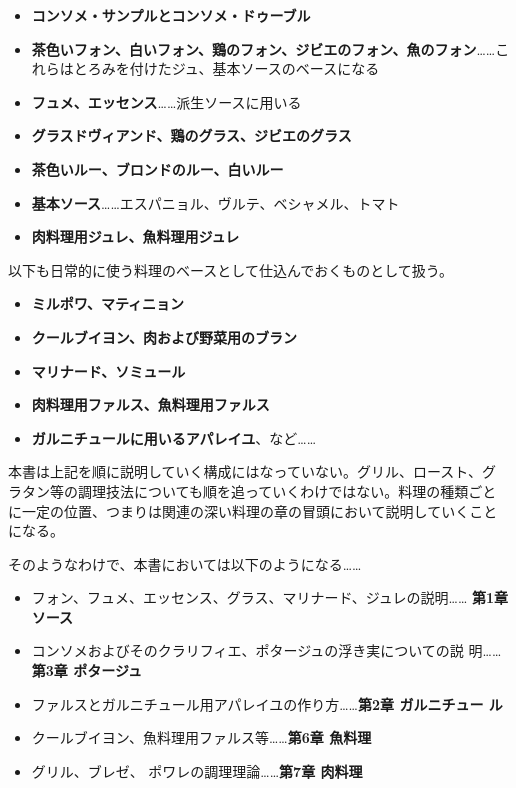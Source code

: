 \begin{itemize}
\tightlist
\item
  \textbf{コンソメ・サンプルとコンソメ・ドゥーブル}
\item
  \textbf{茶色いフォン、白いフォン、鶏のフォン、ジビエのフォン、魚のフォン}\ldots{}\ldots{}これらはとろみを付けたジュ、基本ソースのベースになる
\item
  \textbf{フュメ、エッセンス}\ldots{}\ldots{}派生ソースに用いる
\item
  \textbf{グラスドヴィアンド、鶏のグラス、ジビエのグラス}
\item
  \textbf{茶色いルー、ブロンドのルー、白いルー}
\item
  \textbf{基本ソース}\ldots{}\ldots{}エスパニョル、ヴルテ、ベシャメル、トマト
\item
  \textbf{肉料理用ジュレ、魚料理用ジュレ}
\end{itemize}

\vspace*{1.7\zw}

以下も日常的に使う料理のベースとして仕込んでおくものとして扱う。

\begin{itemize}
\tightlist
\item
  \textbf{ミルポワ、マティニョン}
\item
  \textbf{クールブイヨン、肉および野菜用のブラン}
\item
  \textbf{マリナード、ソミュール}
\item
  \textbf{肉料理用ファルス、魚料理用ファルス}
\item
  \textbf{ガルニチュールに用いるアパレイユ}、など\ldots{}\ldots{}
\end{itemize}

\vspace*{1.7\zw}

本書は上記を順に説明していく構成にはなっていない。グリル、ロースト、グ
ラタン等の調理技法についても順を追っていくわけではない。料理の種類ごと
に一定の位置、つまりは関連の深い料理の章の冒頭において説明していくこと
になる。

\vspace*{1.7\zw}

そのようなわけで、本書においては以下のようになる\ldots{}\ldots{}

\begin{itemize}
\tightlist
\item
  フォン、フュメ、エッセンス、グラス、マリナード、ジュレの説明\ldots{}\ldots{}
  \textbf{ 第1章 ソース}
\item
  コンソメおよびそのクラリフィエ、ポタージュの浮き実についての説
  明\ldots{}\ldots{}\textbf{第3章 ポタージュ}
\item
  ファルスとガルニチュール用アパレイユの作り方\ldots{}\ldots{}\textbf{第2章
  ガルニチュー ル}
\item
  クールブイヨン、魚料理用ファルス等\ldots{}\ldots{}\textbf{第6章
  魚料理}
\item
  グリル、ブレゼ、 ポワレの調理理論\ldots{}\ldots{}\textbf{第7章 肉料理}
\end{itemize}

